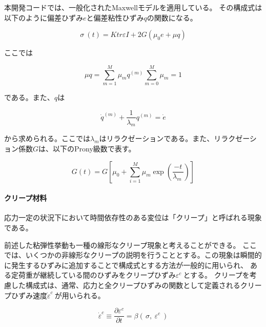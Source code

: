 \documentclass[a4paper,pandoc,ja=standard]{bxjsarticle}
\let\oldparagraph\paragraph
\renewcommand{\paragraph}[1]{\oldparagraph{#1}\mbox{}}
\begin{document}
本開発コードでは、一般化されたMaxwellモデルを適用している。
その構成式は以下のように偏差ひずみ\(e\)と偏差粘性ひずみ\(q\)の関数になる。

\begin{equation}
\sigma \ (t) = Ktr \varepsilon I + 2 G ( \mu_0 e + \mu q )
\label{eq:2.2.55}
\end{equation}

ここでは

\begin{equation}
\mu q = \sum_{m = 1}^{M} \mu_{m} q^{(m)} \sum_{m = 0}^{M} \mu_{m} = 1
\label{eq:2.2.56}
\end{equation}

である。また、\(q\)は

\begin{equation}
{\dot{q}}^{(m)} + \frac{1}{\lambda_{m}} q^{(m)} = \dot{e}
\label{eq:2.2.57}
\end{equation}

から求められる。ここでは\(\lambda_m\)はリラクゼーションである。また、リラクゼーション係数\(G\)は、以下のProny級数で表す。

\begin{equation}
G (t) = G \left[ \mu_0 + \sum_{i = 1}^M {\mu_m \exp\left( \frac{-t}{\lambda_m \ } \right)} \right]
\label{eq:2.2.58}
\end{equation}

\hypertarget{ux30afux30eaux30fcux30d7ux6750ux6599}{%
\paragraph{クリープ材料}\label{ux30afux30eaux30fcux30d7ux6750ux6599}}

応力一定の状況下において時間依存性のある変位は「クリープ」と呼ばれる現象である。

前述した粘弾性挙動も一種の線形なクリープ現象と考えることができる。
ここでは、いくつかの非線形なクリープの説明を行うこととする。この現象は瞬間的に発生するひずみに追加することで構成式とする方法が一般的に用いられ、
ある定荷重が継続している間のひずみをクリープひずみ\(\varepsilon^c\ \)とする。
クリープを考慮した構成式は、通常、応力と全クリープひずみの関数として定義されるクリープひずみ速度\({\dot{\varepsilon}}^c\ \)が用いられる。

\begin{equation}
{\dot{\varepsilon}}^c \equiv \frac{\partial \varepsilon^c}{\partial t} = \beta ( \,\sigma,\ \varepsilon^c\  )
\label{eq:2.2.59}
\end{equation}
\end{document}
